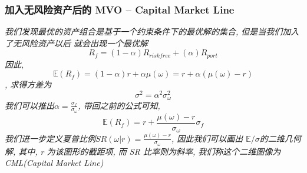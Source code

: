 \documentclass{scrartcl}
\numberwithin{equation}{section}
\begin{document}
\newpage
\subsubsection{加入无风险资产后的 MVO --  Capital Market Line }
\textsl{我们发现最优的资产组合是基于一个约束条件下的最优解的集合, 但是当我们加入了无风险资产以后 就会出现一个最优解 $$R_f = (1- \alpha) R_{riskfree} + (\alpha) R_{port}$$因此, $$ \mathbb{E}(R_f)= (1-\alpha) r + \alpha\mu(\omega )  = r + \alpha(\mu(\omega) -r)$$, 求得方差为 $$\sigma^2 = \alpha^2 \sigma_{\omega}^2$$ 我们可以推出$\alpha = \frac{\sigma_f}{\sigma_{\omega}}$, 带回之前的公式可知, $$\mathbb{E}(R_f) =  r+\frac{\mu(\omega) -r}{\sigma_{\omega}} \sigma_f $$ 我们进一步定义夏普比例$SR(\omega| r)  =\frac{\mu(\omega) -r}{\sigma_{\omega}} $, 因此我们可以画出 $\mathbb{E} / \sigma$的二维几何解, 其中, r 为该图形的截距项, 而 SR 比率则为斜率, 我们称这个二维图像为  CML(Capital Market Line)}
\end{document}
